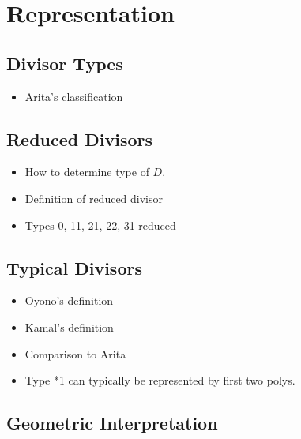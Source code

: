 
\section{Representation}
\label{chap_representation}



\subsection{Divisor Types}

\begin{itemize}
  \item Arita's classification
\end{itemize}



\subsection{Reduced Divisors}

\begin{itemize}
  \item How to determine type of $\bar D$.
  \item Definition of reduced divisor
  \item Types 0, 11, 21, 22, 31 reduced
\end{itemize}



\subsection{Typical Divisors}

\begin{itemize}
  \item Oyono's definition
  \item Kamal's definition
  \item Comparison to Arita
  \item Type *1 can typically be represented by first two polys.
\end{itemize}



\subsection{Geometric Interpretation}

